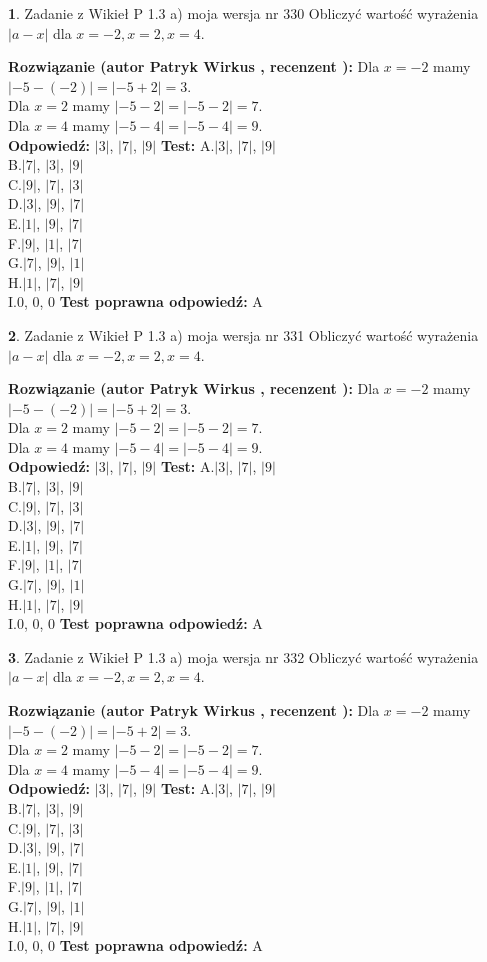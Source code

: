 \documentclass[12pt, a4paper]{article}
\theoremstyle{definition} %
\newtheorem{zad}{}
\newcommand{\zadStart}[1]{\begin{zad}#1\newline}
\newcommand{\zadStop}{\end{zad}}
\newcommand{\rozwStart}[2]{\noindent \textbf{Rozwiązanie (autor #1 , recenzent #2): }\newline}
\newcommand{\rozwStop}{\newline}
\newcommand{\odpStart}{\noindent \textbf{Odpowiedź:}\newline}
\newcommand{\odpStop}{\newline}
\newcommand{\testStart}{\noindent \textbf{Test:}\newline}
\newcommand{\testStop}{\newline}
\newcommand{\kluczStart}{\noindent \textbf{Test poprawna odpowiedź:}\newline}
\newcommand{\kluczStop}{\newline}
\begin{document}
\zadStart{Zadanie z Wikieł P 1.3 a) moja wersja nr 330}
Obliczyć wartość wyrażenia $|a - x|$ dla $x=-2,x=2,x=4$.
\zadStop
\rozwStart{Patryk Wirkus}{}
Dla $x = -2$ mamy $|-5 - (-2)| = |-5 + 2| = 3$.\\
Dla $x = 2$ mamy $|-5 - 2| = |-5 - 2| = 7$.\\
Dla $x = 4$ mamy $|-5 - 4| = |-5 - 4| = 9$.\\
\rozwStop
\odpStart
$|3|$, $|7|$, $|9|$
\odpStop
\testStart
A.$|3|$, $|7|$, $|9|$\\
B.$|7|$, $|3|$, $|9|$\\
C.$|9|$, $|7|$, $|3|$\\
D.$|3|$, $|9|$, $|7|$\\
E.$|1|$, $|9|$, $|7|$\\
F.$|9|$, $|1|$, $|7|$\\
G.$|7|$, $|9|$, $|1|$\\
H.$|1|$, $|7|$, $|9|$\\
I.$0$, $0$, $0$
\testStop
\kluczStart
A
\kluczStop



\zadStart{Zadanie z Wikieł P 1.3 a) moja wersja nr 331}
Obliczyć wartość wyrażenia $|a - x|$ dla $x=-2,x=2,x=4$.
\zadStop
\rozwStart{Patryk Wirkus}{}
Dla $x = -2$ mamy $|-5 - (-2)| = |-5 + 2| = 3$.\\
Dla $x = 2$ mamy $|-5 - 2| = |-5 - 2| = 7$.\\
Dla $x = 4$ mamy $|-5 - 4| = |-5 - 4| = 9$.\\
\rozwStop
\odpStart
$|3|$, $|7|$, $|9|$
\odpStop
\testStart
A.$|3|$, $|7|$, $|9|$\\
B.$|7|$, $|3|$, $|9|$\\
C.$|9|$, $|7|$, $|3|$\\
D.$|3|$, $|9|$, $|7|$\\
E.$|1|$, $|9|$, $|7|$\\
F.$|9|$, $|1|$, $|7|$\\
G.$|7|$, $|9|$, $|1|$\\
H.$|1|$, $|7|$, $|9|$\\
I.$0$, $0$, $0$
\testStop
\kluczStart
A
\kluczStop



\zadStart{Zadanie z Wikieł P 1.3 a) moja wersja nr 332}
Obliczyć wartość wyrażenia $|a - x|$ dla $x=-2,x=2,x=4$.
\zadStop
\rozwStart{Patryk Wirkus}{}
Dla $x = -2$ mamy $|-5 - (-2)| = |-5 + 2| = 3$.\\
Dla $x = 2$ mamy $|-5 - 2| = |-5 - 2| = 7$.\\
Dla $x = 4$ mamy $|-5 - 4| = |-5 - 4| = 9$.\\
\rozwStop
\odpStart
$|3|$, $|7|$, $|9|$
\odpStop
\testStart
A.$|3|$, $|7|$, $|9|$\\
B.$|7|$, $|3|$, $|9|$\\
C.$|9|$, $|7|$, $|3|$\\
D.$|3|$, $|9|$, $|7|$\\
E.$|1|$, $|9|$, $|7|$\\
F.$|9|$, $|1|$, $|7|$\\
G.$|7|$, $|9|$, $|1|$\\
H.$|1|$, $|7|$, $|9|$\\
I.$0$, $0$, $0$
\testStop
\kluczStart
A
\kluczStop
\end{document}
